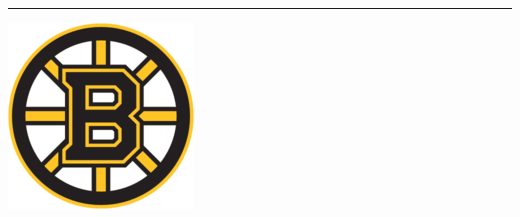 \documentclass[landscape]{article}
\begin{document}
\begin{multicols}{3}
\hrule
\begin{center}
	
\end{center}
\begin{minipage}{0.1\linewidth}
	\includegraphics[width=\linewidth]{images/bruins-logo.png}
\end{minipage}
\begin{minipage}{0.9\linewidth}
	
\end{minipage}


\end{multicols}
\end{document}
